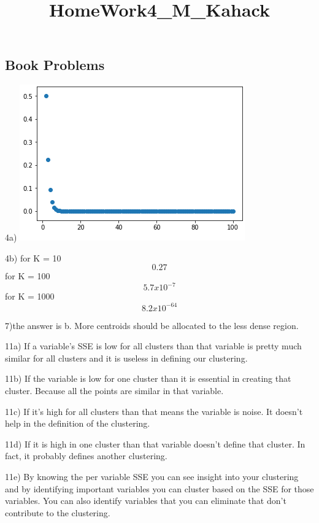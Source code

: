 \documentclass[11pt]{article}
\title{HomeWork4\_M\_Kahack}
\makeatletter
\def\maxwidth{\ifdim\Gin@nat@width>\linewidth\linewidth
    \else\Gin@nat@width\fi}
\let\Oldincludegraphics\includegraphics
\renewcommand{\includegraphics}[1]{\Oldincludegraphics[width=.8\maxwidth]{#1}}
\makeatother
\begin{document}
    
    
    \maketitle
    
    

    
    \subsection{Book Problems}\label{book-problems}

    4a) \includegraphics{clusters.png}

    4b) for K = 10 \[ 0.27\] for K = 100 \[ 5.7x10^{-7} \] for K = 1000
\[ 8.2x10^{-64}\]

7)the answer is b. More centroids should be allocated to the less dense
region.

11a) If a variable's SSE is low for all clusters than that variable is
pretty much similar for all clusters and it is useless in defining our
clustering.

11b) If the variable is low for one cluster than it is essential in
creating that cluster. Because all the points are similar in that
variable.

11c) If it's high for all clusters than that means the variable is
noise. It doesn't help in the definition of the clustering.

11d) If it is high in one cluster than that variable doesn't define that
cluster. In fact, it probably defines another clustering.

11e) By knowing the per variable SSE you can see insight into your
clustering and by identifying important variables you can cluster based
on the SSE for those variables. You can also identify variables that you
can eliminate that don't contribute to the clustering.
\end{document}
